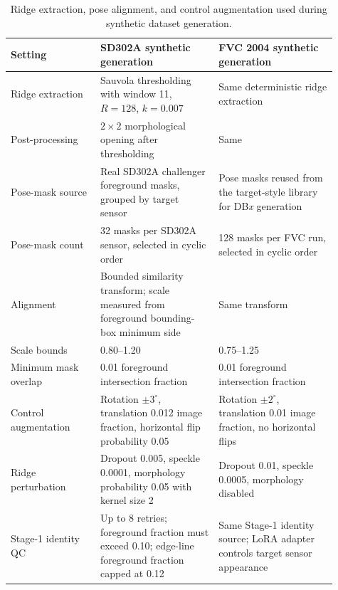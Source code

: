 \documentclass{article}
\begin{document}
\begin{table}[!htbp]
    \centering
    \small
    \caption{Ridge extraction, pose alignment, and control augmentation used
    during synthetic dataset generation.}
    \label{tab:appendix_control_hparams}
    \setlength{\tabcolsep}{5pt}
    \renewcommand{\arraystretch}{1.05}
    \begin{tabular}{p{0.25\linewidth}|p{0.33\linewidth}p{0.33\linewidth}}
        \toprule
        Setting & SD302A synthetic generation & FVC 2004 synthetic generation \\
        \midrule
        Ridge extraction
        & Sauvola thresholding with window 11, $R=128$, $k=0.007$
        & Same deterministic ridge extraction \\
        Post-processing
        & $2\times2$ morphological opening after thresholding
        & Same \\
        Pose-mask source
        & Real SD302A challenger foreground masks, grouped by target sensor
        & Pose masks reused from the target-style library for DB\emph{x}
        generation \\
        Pose-mask count
        & 32 masks per SD302A sensor, selected in cyclic order
        & 128 masks per FVC run, selected in cyclic order \\
        Alignment
        & Bounded similarity transform; scale measured from foreground
        bounding-box minimum side
        & Same transform \\
        Scale bounds
        & 0.80--1.20
        & 0.75--1.25 \\
        Minimum mask overlap
        & 0.01 foreground intersection fraction
        & 0.01 foreground intersection fraction \\
        Control augmentation
        & Rotation $\pm3^\circ$, translation 0.012 image fraction,
        horizontal flip probability 0.05
        & Rotation $\pm2^\circ$, translation 0.01 image fraction, no horizontal
        flips \\
        Ridge perturbation
        & Dropout 0.005, speckle 0.0001, morphology probability 0.05 with
        kernel size 2
        & Dropout 0.01, speckle 0.0005, morphology disabled \\
        Stage-1 identity QC
        & Up to 8 retries; foreground fraction must exceed 0.10; edge-line
        foreground fraction capped at 0.12
        & Same Stage-1 identity source; LoRA adapter controls target sensor
        appearance \\
        \bottomrule
    \end{tabular}
\end{table}
\FloatBarrier
\end{document}
